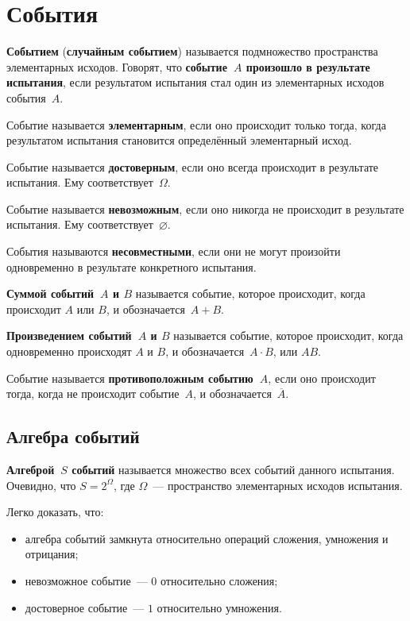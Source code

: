 \section{События}
 \textbf{Событием} (\textbf{случайным событием}) называется подмножество пространства элементарных исходов.
Говорят, что \textbf{событие~$A$ произошло в результате испытания}, если результатом испытания стал один из элементарных исходов события~$A$.

Событие называется \textbf{элементарным}, если оно происходит только тогда, когда результатом испытания становится определённый элементарный исход.

Событие называется \textbf{достоверным}, если оно всегда происходит в результате испытания.
Ему соответствует~$\Omega$.

Событие называется \textbf{невозможным}, если оно никогда не происходит в результате испытания.
Ему соответствует~$\varnothing$.

События называются \textbf{несовместными}, если они не могут произойти одновременно в результате конкретного испытания.

\textbf{Суммой событий~$A$ и $B$} называется событие, которое происходит, когда происходит $A$ или $B$, и обозначается~$A + B$.

\textbf{Произведением событий~$A$ и $B$} называется событие, которое происходит, когда одновременно происходят $A$ и $B$, и обозначается~$A \cdot B$, или $AB$.

Событие называется \textbf{противоположным событию~$A$}, если оно происходит тогда, когда не происходит событие~$A$, и обозначается~$\overline A$.

\subsection{Алгебра событий}
 \textbf{Алгеброй~$S$ событий} называется множество всех событий данного испытания.
Очевидно, что $S = 2^\Omega$, где $\Omega$~--- пространство элементарных исходов испытания.

Легко доказать, что:
\begin{itemize}
	\item алгебра событий замкнута относительно операций сложения, умножения и отрицания;
	\item невозможное событие~--- $0$ относительно сложения;
	\item достоверное событие~--- $1$ относительно умножения.
\end{itemize}